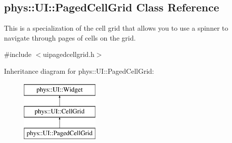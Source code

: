 \hypertarget{classphys_1_1UI_1_1PagedCellGrid}{
\subsection{phys::UI::PagedCellGrid Class Reference}
\label{d5/d27/classphys_1_1UI_1_1PagedCellGrid}
}


This is a specialization of the cell grid that allows you to use a spinner to navigate through pages of cells on the grid.  




{\ttfamily \#include $<$uipagedcellgrid.h$>$}

Inheritance diagram for phys::UI::PagedCellGrid:\begin{figure}[H]
\begin{center}
\leavevmode
\includegraphics[height=3.000000cm]{d5/d27/classphys_1_1UI_1_1PagedCellGrid}
\end{center}
\end{figure}
